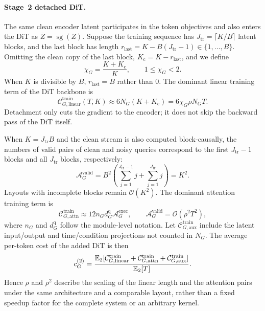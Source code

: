 \paragraph{Stage~2 detached DiT.}
The same clean encoder latent participates in the token objectives and also enters the DiT as $\bar Z=\operatorname{sg}(Z)$. Suppose the training sequence has $J_{\mathrm{tr}}=\lceil K/B\rceil$ latent blocks, and the last block has length $r_{\mathrm{last}}=K-B(J_{\mathrm{tr}}-1)\in\{1,\ldots,B\}$. Omitting the clean copy of the last block, $K_{\mathrm c}=K-r_{\mathrm{last}}$, and we define
\begin{equation}
    \chi_G=\frac{K+K_{\mathrm c}}{K},
    \qquad 1\le\chi_G<2.
    \label{eq:app-cost-dit-layout-factor}
\end{equation}
When $K$ is divisible by $B$, $r_{\mathrm{last}}=B$ rather than $0$. The dominant linear training term of the DiT backbone is
\begin{equation}
    \mathcal C_{G,\mathrm{linear}}^{\mathrm{train}}(T,K)
    \approx 6N_G(K+K_{\mathrm c})
    =6\chi_G\rho N_GT.
    \label{eq:app-cost-dit-train-linear}
\end{equation}
Detachment only cuts the gradient to the encoder; it does not skip the backward pass of the DiT itself.

When $K=J_{\mathrm{tr}}B$ and the clean stream is also computed block-causally, the numbers of valid pairs of clean and noisy queries correspond to the first $J_{\mathrm{tr}}-1$ blocks and all $J_{\mathrm{tr}}$ blocks, respectively:
\begin{equation}
    \mathcal A_G^{\mathrm{valid}}
    =B^2\left(\sum_{j=1}^{J_{\mathrm{tr}}-1}j
             +\sum_{j=1}^{J_{\mathrm{tr}}}j\right)
    =K^2.
    \label{eq:app-cost-dit-valid-pairs}
\end{equation}
Layouts with incomplete blocks remain $\mathcal O(K^2)$. The dominant attention training term is
\begin{equation}
    \mathcal C_{G,\mathrm{attn}}^{\mathrm{train}}
    \approx 12n_Gd_G^{\mathrm q}\mathcal A_G^{\mathrm{exec}},
    \qquad
    \mathcal A_G^{\mathrm{valid}}=\mathcal O(\rho^2T^2),
    \label{eq:app-cost-dit-train-attn}
\end{equation}
where $n_G$ and $d_G^{\mathrm q}$ follow the module-level notation. Let $\mathcal C_{G,\mathrm{aux}}^{\mathrm{train}}$ include the latent input/output and time/condition projections not counted in $N_G$. The average per-token cost of the added DiT is then
\begin{equation}
    c_G^{(2)}
    =\frac{\mathbb{E}_2[\mathcal C_{G,\mathrm{linear}}^{\mathrm{train}}
                 +\mathcal C_{G,\mathrm{attn}}^{\mathrm{train}}
                 +\mathcal C_{G,\mathrm{aux}}^{\mathrm{train}}]}{\mathbb{E}_2[T]}.
    \label{eq:app-cost-dit-per-token}
\end{equation}
Hence $\rho$ and $\rho^2$ describe the scaling of the linear length and the attention pairs under the same architecture and a comparable layout, rather than a fixed speedup factor for the complete system or an arbitrary kernel.

